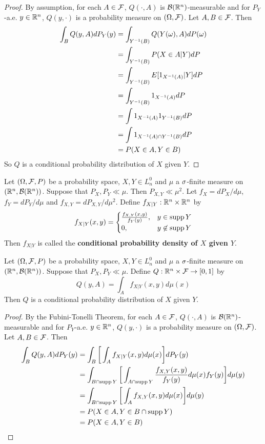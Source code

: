 \documentclass{book}
\begin{document}
	\begin{proof}
	By assumption, for each $A \in \mathcal{F}$, $Q(\cdot, A)$ is $\mathcal{B}(\mathbb{R}^n)$-measurable and for $P_Y$-a.e. $y \in \mathbb{R}^n$, $Q(y, \cdot)$ is a probability measure on $(\Omega, \mathcal{F})$. Let $A,B \in \mathcal{F}$. Then
	\begin{align*}
	\int_B Q(y, A) dP_Y(y)
	&= \int_{Y^{-1}(B)} Q(Y(\omega), A) dP(\omega) \\
	&= \int_{Y^{-1}(B)}  P(X \in A|Y) dP \\
	&= \int_{Y^{-1}(B)}  E[1_{X^{-1}(A)}|Y] dP \\
	&= \int_{Y^{-1}(B)}  1_{X^{-1}(A)} dP \\
	&= \int 1_{X^{-1}(A)}  1_{Y^{-1}(B)} dP \\
	&= \int 1_{X^{-1}(A) \cap Y^{-1}(B)} dP \\
	&= P(X \in A, Y \in B)
	\end{align*}
	So $Q$ is a conditional probability distribution of $X$ given $Y$.
	\end{proof}
	
	\begin{defn}
	Let $(\Omega, \mathcal{F}, P)$ be a probability space, $X,Y \in L_n^0$ and $\mu$ a $\sigma$-finite measure on $(\mathbb{R}^n, \mathcal{B}(\mathbb{R}^n))$. Suppose that $P_X, P_Y \ll \mu$. Then $P_{X,Y} \ll \mu^2$. Let $f_X = dP_X/d \mu$, $f_Y = dP_Y/d \mu$ and $f_{X,Y} = dP_{X,Y}/d \mu^2$. Define $f_{X|Y}: \mathbb{R}^n \times \mathbb{R}^n$ by 
	\[
	f_{X|Y}(x,y) = 
	\begin{cases}
	\frac{f_{X,Y}(x,y)}{f_Y(y)},& y \in \operatorname{supp} Y \\
	0, &y \not \in \operatorname{supp} Y 
	\end{cases}
	\] 
	Then $f_{X|Y}$ is called the \textbf{conditional probability density of $X$ given $Y$}.
	\end{defn}	
	
	\begin{ex}
	Let $(\Omega, \mathcal{F}, P)$ be a probability space, $X,Y \in L_n^0$ and $\mu$ a $\sigma$-finite measure on $(\mathbb{R}^n, \mathcal{B}(\mathbb{R}^n))$. Suppose that $P_X, P_Y \ll \mu$. Define $Q: \mathbb{R}^n \times \mathcal{F} \rightarrow [0,1]$ by 
	$$Q(y, A) = \int_A f_{X|Y}(x,y) d\mu(x)$$ 
	Then $Q$ is a conditional probability distribution of $X$ given $Y$.
	\end{ex}	
	
	\begin{proof}
	By the Fubini-Tonelli Theorem, for each $A \in \mathcal{F}$, $Q(\cdot, A)$ is $\mathcal{B}(\mathbb{R}^n)$-measurable and for $P_Y$-a.e. $y \in \mathbb{R}^n$, $Q(y, \cdot)$ is a probability measure on $(\Omega, \mathcal{F})$. Let $A, B \in \mathcal{F}$. Then 
	\begin{align*}
	\int_B Q(y, A) dP_Y(y)
	&= \int_B \bigg[ \int_A f_{X|Y}(x,y) d\mu(x) \bigg] dP_Y(y) \\
	&= \int_{B \cap \operatorname{supp} Y} \bigg[ \int_{A \cap \operatorname{supp} Y} \frac{f_{X,Y}(x,y)}{f_Y(y)} d\mu(x) f_Y(y) \bigg] d \mu(y) \\
	&= \int_{B \cap \operatorname{supp} Y}  \bigg[\int_A f_{X,Y}(x,y) d\mu(x) \bigg] d \mu(y) \\
	&= P(X \in A, Y \in B \cap \operatorname{supp} Y) \\
	&= P(X \in A, Y \in B) \\	
	\end{align*}
	\end{proof}
	
\end{document}
